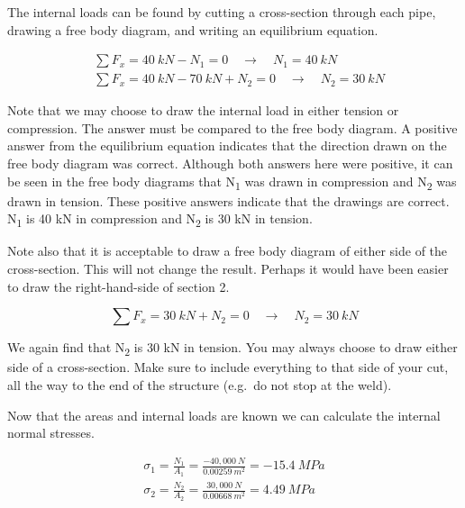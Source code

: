 \documentclass[
  letterpaper,
  DIV=11,
  numbers=noendperiod]{scrreprt}
\theoremstyle{definition}
\theoremstyle{remark}
\begin{document}
\begin{tcolorbox}
\begin{tcolorbox}
The internal loads can be found by cutting a cross-section through each
pipe, drawing a free body diagram, and writing an equilibrium equation.

\[
\begin{aligned}
&\sum F_x=40{~kN}-N_1=0 \quad \rightarrow \quad N_1=40{~kN} \\
&\sum F_x=40{~kN}-70{~kN}+N_2=0 \quad \rightarrow \quad N_2=30{~kN}
\end{aligned}
\]

Note that we may choose to draw the internal load in either tension or
compression. The answer must be compared to the free body diagram. A
positive answer from the equilibrium equation indicates that the
direction drawn on the free body diagram was correct. Although both
answers here were positive, it can be seen in the free body diagrams
that N\textsubscript{1} was drawn in compression and N\textsubscript{2}
was drawn in tension. These positive answers indicate that the drawings
are correct. N\textsubscript{1} is 40 kN in compression and
N\textsubscript{2} is 30 kN in tension.

Note also that it is acceptable to draw a free body diagram of either
side of the cross-section. This will not change the result. Perhaps it
would have been easier to draw the right-hand-side of section 2.

\[
\sum F_x=30{~kN}+N_2=0 \quad \rightarrow \quad N_2=30{~kN}
\]

We again find that N\textsubscript{2} is 30 kN in tension. You may
always choose to draw either side of a cross-section. Make sure to
include everything to that side of your cut, all the way to the end of
the structure (e.g.~do not stop at the weld).

Now that the areas and internal loads are known we can calculate the
internal normal stresses.

\[
\begin{gathered}
\sigma_1=\frac{N_1}{A_1}=\frac{-40,000{~N}}{0.00259{~m}^2}=-15.4{~MPa} \\
\sigma_2=\frac{N_2}{A_2}=\frac{30,000{~N}}{0.00668{~m}^2}=4.49{~MPa}
\end{gathered}
\]

\end{tcolorbox}

\end{tcolorbox}
\end{document}
